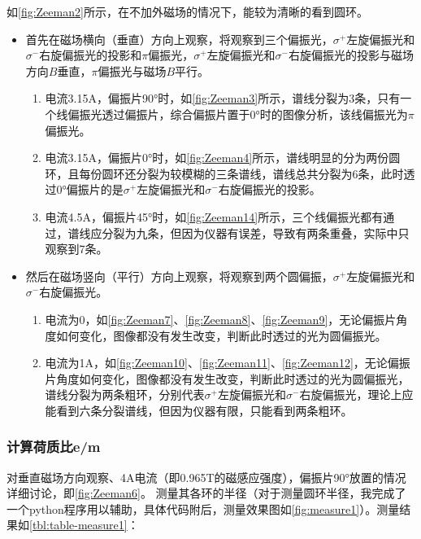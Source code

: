 \documentclass[dvipsnames, svgnames,a4paper,11pt]{article}
\begin{document}
		如\cref{fig:Zeeman2}所示，在不加外磁场的情况下，能较为清晰的看到圆环。
		\begin{itemize}
			\item 首先在磁场横向（垂直）方向上观察，将观察到三个偏振光，$\sigma^+$左旋偏振光和$\sigma^-$右旋偏振光的投影和$\pi$偏振光，$\sigma^+$左旋偏振光和$\sigma^-$右旋偏振光的投影与磁场方向$B$垂直，$\pi$偏振光与磁场$B$平行。
			
				\begin{enumerate}
					\item 电流3.15A，偏振片90°时，如\cref{fig:Zeeman3}所示，谱线分裂为3条，只有一个线偏振光透过偏振片，综合偏振片置于0°时的图像分析，该线偏振光为$\pi$偏振光。
					\item 电流3.15A，偏振片0°时，如\cref{fig:Zeeman4}所示，谱线明显的分为两份圆环，且每份圆环还分裂为较模糊的三条谱线，谱线总共分裂为6条，此时透过0°偏振片的是$\sigma^+$左旋偏振光和$\sigma^-$右旋偏振光的投影。
					\item 电流4.5A，偏振片45°时，如\cref{fig:Zeeman14}所示，三个线偏振光都有通过，谱线应分裂为九条，但因为仪器有误差，导致有两条重叠，实际中只观察到7条。
					
				\end{enumerate}

			\item 然后在磁场竖向（平行）方向上观察，将观察到两个圆偏振，$\sigma^+$左旋偏振光和$\sigma^-$右旋偏振光。
				
				\begin{enumerate}
					\item 电流为0，如\cref{fig:Zeeman7}、\cref{fig:Zeeman8}、\cref{fig:Zeeman9}，无论偏振片角度如何变化，图像都没有发生改变，判断此时透过的光为圆偏振光。
					\item 电流为1A，如\cref{fig:Zeeman10}、\cref{fig:Zeeman11}、\cref{fig:Zeeman12}，无论偏振片角度如何变化，图像都没有发生改变，判断此时透过的光为圆偏振光，谱线分裂为两条粗环，分别代表$\sigma^+$左旋偏振光和$\sigma^-$右旋偏振光，理论上应能看到六条分裂谱线，但因为仪器有限，只能看到两条粗环。
				\end{enumerate}
		\end{itemize}
		


\clearpage

	\subsubsection{计算荷质比e/m}

		对垂直磁场方向观察、4A电流（即0.965T的磁感应强度），偏振片90°放置的情况详细讨论，即\cref{fig:Zeeman6}。
		测量其各环的半径（对于测量圆环半径，我完成了一个python程序用以辅助，具体代码附后，测量效果图如\cref{fig:measure1}）。测量结果如\cref{tbl:table-measure1}：
\end{document}
